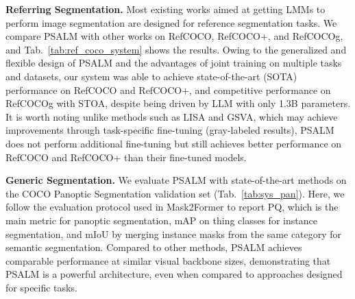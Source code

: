 \noindent\textbf{Referring Segmentation.} 
Most existing works aimed at getting LMMs to perform image segmentation are designed for reference segmentation tasks. We compare PSALM with other works on RefCOCO, RefCOCO+, and RefCOCOg, and Tab.~\ref{tab:ref_coco_system} shows the results. 
Owing to the generalized and flexible design of PSALM and the advantages of joint training on multiple tasks and datasets, our system was able to achieve state-of-the-art (SOTA) performance on RefCOCO and RefCOCO+, and competitive performance on RefCOCOg with STOA, despite being driven by LLM with only 1.3B parameters. 
It is worth noting unlike methods such as LISA and GSVA, which may achieve improvements through task-specific fine-tuning (gray-labeled results), PSALM does not perform additional fine-tuning but still achieves better performance on RefCOCO and RefCOCO+ than their fine-tuned models.

\noindent\textbf{Generic Segmentation.} 
We evaluate PSALM with state-of-the-art methods on the COCO Panoptic Segmentation validation set (Tab.~\ref{tab:sys_pan}). Here, we follow the evaluation protocol used in Mask2Former to report PQ, which is the main metric for panoptic segmentation, mAP on thing classes for instance segmentation, and mIoU by merging instance masks from the same category for semantic segmentation. 
Compared to other methods, PSALM achieves comparable performance at similar visual backbone sizes, demonstrating that PSALM is a powerful architecture, even when compared to approaches designed for specific tasks.

\begin{table}[h!]
\centering
\caption{Comparison with the state-of-the-art methods on Panoptic COCO-val. We abbreviate the datasets: COCO-SAM(CM)~\cite{omgseg}, VIPSeg (VIP)~\cite{vipseg}, while others following Tab.~\ref{tab:ref_coco_system}.}
\footnotesize
\renewcommand{\arraystretch}{0.9}
\label{tab:sys_pan}
\end{table}

